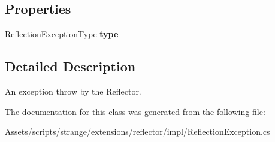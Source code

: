 \subsection*{Properties}
\begin{DoxyCompactItemize}
\item 
\hypertarget{classstrange_1_1extensions_1_1reflector_1_1impl_1_1_reflection_exception_a7d966c5d78022218025524fc16de5f6c}{\hyperlink{namespacestrange_1_1extensions_1_1reflector_1_1api_a4470d7d3edf61dfa229aec6e9a914159}{Reflection\-Exception\-Type} {\bfseries type}}\label{classstrange_1_1extensions_1_1reflector_1_1impl_1_1_reflection_exception_a7d966c5d78022218025524fc16de5f6c}

\end{DoxyCompactItemize}


\subsection{Detailed Description}
An exception throw by the Reflector. 

The documentation for this class was generated from the following file\-:\begin{DoxyCompactItemize}
\item 
Assets/scripts/strange/extensions/reflector/impl/Reflection\-Exception.\-cs\end{DoxyCompactItemize}
